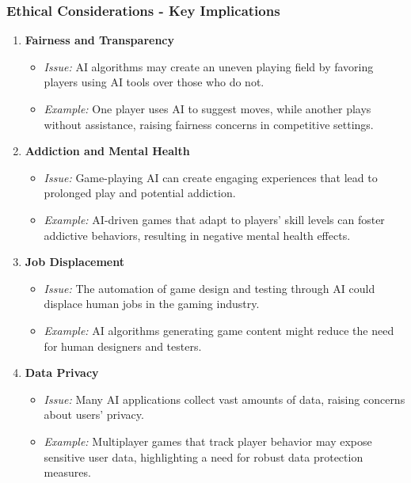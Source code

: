 \documentclass[aspectratio=169]{beamer}
\begin{document}
\begin{frame}[fragile]
    \frametitle{Ethical Considerations - Key Implications}
    \begin{enumerate}
        \item \textbf{Fairness and Transparency}
        \begin{itemize}
            \item \textit{Issue:} AI algorithms may create an uneven playing field by favoring players using AI tools over those who do not.
            \item \textit{Example:} One player uses AI to suggest moves, while another plays without assistance, raising fairness concerns in competitive settings.
        \end{itemize}
        
        \item \textbf{Addiction and Mental Health}
        \begin{itemize}
            \item \textit{Issue:} Game-playing AI can create engaging experiences that lead to prolonged play and potential addiction.
            \item \textit{Example:} AI-driven games that adapt to players' skill levels can foster addictive behaviors, resulting in negative mental health effects.
        \end{itemize}
        
        \item \textbf{Job Displacement}
        \begin{itemize}
            \item \textit{Issue:} The automation of game design and testing through AI could displace human jobs in the gaming industry.
            \item \textit{Example:} AI algorithms generating game content might reduce the need for human designers and testers.
        \end{itemize}
        
        \item \textbf{Data Privacy}
        \begin{itemize}
            \item \textit{Issue:} Many AI applications collect vast amounts of data, raising concerns about users' privacy.
            \item \textit{Example:} Multiplayer games that track player behavior may expose sensitive user data, highlighting a need for robust data protection measures.
        \end{itemize}
    \end{enumerate}
\end{frame}
\end{document}
